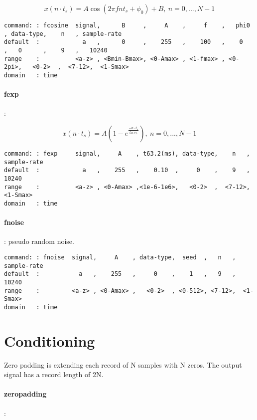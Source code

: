 \documentclass{report}
\newcommand{\bc}{\scriptsize}
\newcommand{\ec}{\normalsize}
\begin{document}
\[ x(n \cdot t_{s}) = A \cos (2\pi fnt_{s} + \phi_{0})+B,~ n=0,...,N-1 \]

\bc
\begin{verbatim}
command: : fcosine  signal,      B     ,     A    ,     f    ,   phi0 , data-type,    n   , sample-rate
default  :            a   ,      0     ,    255   ,    100   ,    0   ,   0      ,    9   ,   10240
range    :          <a-z> , <Bmin-Bmax>, <0-Amax> , <1-fmax> , <0-2pi>,   <0-2>  ,  <7-12>,  <1-Smax>
domain   : time
\end{verbatim}
\ec

\paragraph{fexp}:

\[  x(n \cdot t_{s}) = A ( 1 - e^{\frac{-n\cdot t_{s}}{t_{63.2\%}}}),~ n=0,...,N-1 \]

\bc
\begin{verbatim}
command: : fexp     signal,     A    , t63.2(ms), data-type,    n   , sample-rate
default  :            a   ,    255   ,    0.10  ,     0    ,    9   ,   10240
range    :          <a-z> , <0-Amax> ,<1e-6-1e6>,   <0-2>  ,  <7-12>,  <1-Smax>
domain   : time
\end{verbatim}
\ec

\paragraph{fnoise}: pseudo random noise.

\bc
\begin{verbatim}
command: : fnoise  signal,     A    , data-type,  seed  ,   n   , sample-rate
default  :           a   ,    255   ,     0    ,    1   ,   9   ,    10240
range    :         <a-z> , <0-Amax> ,   <0-2>  , <0-512>, <7-12>,  <1-Smax>
domain   : time
\end{verbatim}
\ec

\section{Conditioning}

Zero padding is extending each record of N samples with N zeros.
The output signal has a record length of 2N.

\paragraph{zeropadding}:
\end{document}
